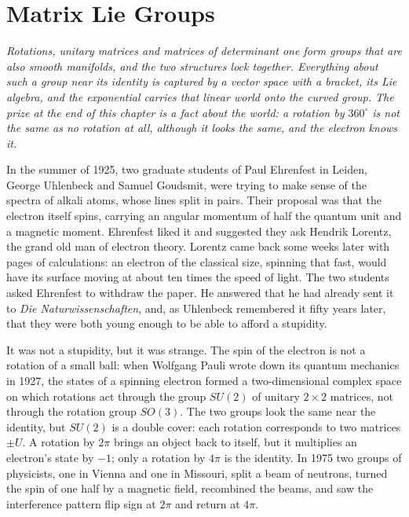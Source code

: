 \chapter{Matrix Lie Groups}

\begin{center}\itshape
Rotations, unitary matrices and matrices of determinant one form groups that are also smooth manifolds, and the two structures lock together. Everything
about such a group near its identity is captured by a vector space with a bracket, its Lie algebra, and the exponential carries that linear world onto the
curved group. The prize at the end of this chapter is a fact about the world: a rotation by $360^\circ$ is not the same as no rotation at all, although it
looks the same, and the electron knows it.
\end{center}

In the summer of 1925, two graduate students of Paul Ehrenfest in Leiden, George Uhlenbeck and Samuel Goudsmit, were trying to make sense of the
spectra of alkali atoms, whose lines split in pairs. Their proposal was that the electron itself spins, carrying an angular momentum of half the
quantum unit and a magnetic moment. Ehrenfest liked it and suggested they ask Hendrik Lorentz, the grand old man of electron theory. Lorentz came back
some weeks later with pages of calculations: an electron of the classical size, spinning that fast, would have its surface moving at about ten times
the speed of light. The two students asked Ehrenfest to withdraw the paper. He answered that he had already sent it to \emph{Die Naturwissenschaften},
and, as Uhlenbeck remembered it fifty years later, that they were both young enough to be able to afford a stupidity.

It was not a stupidity, but it was strange. The spin of the electron is not a rotation of a small ball: when Wolfgang Pauli wrote down its quantum
mechanics in 1927, the states of a spinning electron formed a two-dimensional complex space on which rotations act through the group $SU(2)$ of
unitary $2\times2$ matrices, not through the rotation group $SO(3)$. The two groups look the same near the identity, but $SU(2)$ is a double cover:
each rotation corresponds to two matrices $\pm U$. A rotation by $2\pi$ brings an object back to itself, but it multiplies an electron's state by $-1$;
only a rotation by $4\pi$ is the identity. In 1975 two groups of physicists, one in Vienna and one in Missouri, split a beam of neutrons, turned the spin of
one half by a magnetic field, recombined the beams, and saw the interference pattern flip sign at $2\pi$ and return at $4\pi$.

